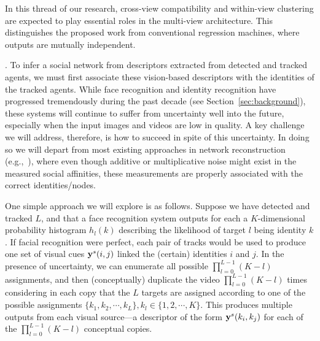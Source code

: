 In this thread of our research,  cross-view compatibility and within-view clustering are expected to play essential roles in the multi-view architecture. This distinguishes the proposed work from conventional regression machines, where outputs are mutually independent.







. To infer a social network from descriptors extracted from detected and tracked agents, we must first associate these vision-based descriptors with the identities of the tracked agents. While face recognition and identity recognition have progressed tremendously during the past decade (see Section~\ref{sec:background}), these systems will continue to suffer from uncertainty well into the future, especially when the input images and videos are low in quality. A key challenge we will address, therefore, is how to succeed in spite of this uncertainty. In doing so we will depart from most existing approaches in network reconstruction (e.g.,~\cite{}), where even though additive or multiplicative noise might exist in the measured social affinities, these measurements are properly associated with the correct identities/nodes.

One simple approach we will explore is as follows. Suppose we have detected and tracked $L$, and that a face recognition system outputs for each a $K$-dimensional probability histogram $h_l(k)$ describing the likelihood of target $l$ being identity $k$. If facial recognition were perfect, each pair of  tracks would be used to produce one set of visual cues ${\bf y}^s(i,j)$ linked the (certain) identities $i$ and $j$. In the presence of uncertainty, we can enumerate all possible $\prod_{l=0}^{L-1}(K-l)$  assignments, and then (conceptually) duplicate the video $\prod_{l=0}^{L-1}(K-l)$ times considering in each copy that the $L$ targets are assigned according to one of the possible assignments $\{k_1, k_2, \cdots, k_L\}, k_l\in\{1,2, \cdots, K\}$. This produces multiple outputs from each visual source---a descriptor of the form ${\bf y}^s(k_i,k_j)$ for each of the $\prod_{l=0}^{L-1}(K-l)$ conceptual copies. 

